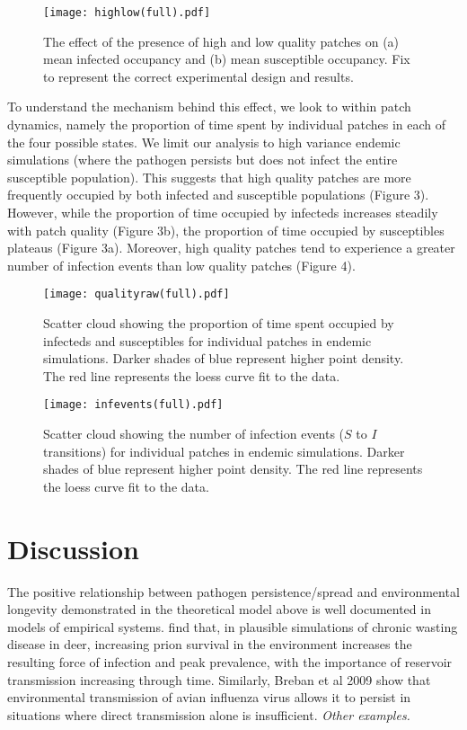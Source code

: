 \documentclass{svjour3}
\begin{document}
\begin{figure}
\label{sens}
\centering
\texttt{[image: highlow(full).pdf]}
\caption{The effect of the presence of high and low quality patches on (a) mean infected occupancy and (b) mean susceptible occupancy. Fix to represent the correct experimental design and results.}
\end{figure}

To understand the mechanism behind this effect, we look to within patch dynamics, namely the proportion of time spent by individual patches in each of the four possible states.  We limit our analysis to high variance endemic simulations (where the pathogen persists but does not infect the entire susceptible population).  This suggests that high quality patches are more frequently occupied by both infected and susceptible populations (Figure 3).  However, while the proportion of time occupied by infecteds increases steadily with patch quality (Figure 3b), the proportion of time occupied by susceptibles plateaus (Figure 3a).  Moreover, high quality patches tend to experience a greater number of infection events than low quality patches (Figure 4).

\begin{figure}
\label{qualityraw}
\centering
\texttt{[image: qualityraw(full).pdf]}
\caption{Scatter cloud showing the proportion of time spent occupied by infecteds and susceptibles for individual patches in endemic simulations. Darker shades of blue represent higher point density. The red line represents the loess curve fit to the data.}
\end{figure}

\begin{figure}
\label{infections}
\centering
\texttt{[image: infevents(full).pdf]}
\caption{Scatter cloud showing the number of infection events ($S$ to $I$ transitions) for individual patches in endemic simulations. Darker shades of blue represent higher point density. The red line represents the loess curve fit to the data.}
\end{figure}

\section{Discussion}
\label{discussion} 

The positive relationship between pathogen persistence/spread and environmental longevity demonstrated in the theoretical model above is well documented in models of empirical systems.  \cite{Almberg2011} find that, in plausible simulations of chronic wasting disease in deer, increasing prion survival in the environment increases the resulting force of infection and peak prevalence, with the  importance of reservoir transmission increasing through time.  Similarly, Breban et al 2009 show that environmental transmission of avian influenza virus allows it to persist in situations where direct transmission alone is insufficient.  \emph{Other examples.}
\end{document}
